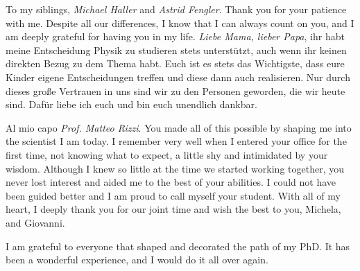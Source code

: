 To my siblings, {\it Michael Haller} and {\it Astrid Fengler}.
Thank you for your patience with me.
Despite all our differences, I know that I can always count on you, and I am deeply grateful for having you in my life.
{\it Liebe Mama, lieber Papa}, ihr habt meine Entscheidung Physik zu studieren stets unterstützt, auch wenn ihr keinen direkten Bezug zu dem Thema habt.
Euch ist es stets das Wichtigste, dass eure Kinder eigene Entscheidungen treffen und diese dann auch realisieren.
Nur durch dieses große Vertrauen in uns sind wir zu den Personen geworden, die wir heute sind.
Dafür liebe ich euch und bin euch unendlich dankbar.

Al mio capo {\it Prof. Matteo Rizzi}.
You made all of this possible by shaping me into the scientist I am today.
I remember very well when I entered your office for the first time, not knowing what to expect, a little shy and intimidated by your wisdom.
Although I knew so little at the time we started working together, you never lost interest and aided me to the best of your abilities.
I could not have been guided better and I am proud to call myself your student.
With all of my heart, I deeply thank you for our joint time and wish the best to you, Michela, and Giovanni.

I am grateful to everyone that shaped and decorated the path of my PhD.
It has been a wonderful experience, and I would do it all over again.
